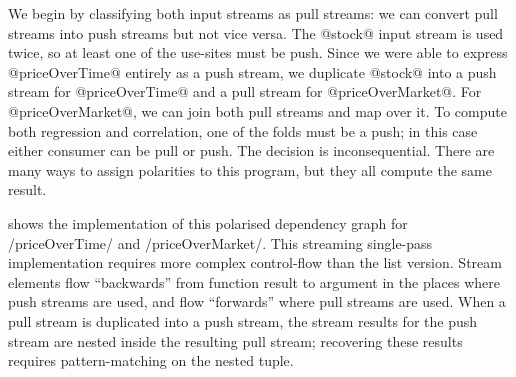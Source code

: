 

We begin by classifying both input streams as pull streams: we can convert pull streams into push streams but not vice versa.
The @stock@ input stream is used twice, so at least one of the use-sites must be push.
Since we were able to express @priceOverTime@ entirely as a push stream, we duplicate @stock@ into a push stream for @priceOverTime@ and a pull stream for @priceOverMarket@.
For @priceOverMarket@, we can join both pull streams and map over it.
To compute both regression and correlation, one of the folds must be a push; in this case either consumer can be pull or push.
The decision is inconsequential.
There are many ways to assign polarities to this program, but they all compute the same result.

 shows the implementation of this polarised dependency graph for \Hs/priceOverTime/ and \Hs/priceOverMarket/.
This streaming single-pass implementation requires more complex control-flow than the list version.
Stream elements flow ``backwards'' from function result to argument in the places where push streams are used, and flow ``forwards'' where pull streams are used.
When a pull stream is duplicated into a push stream, the stream results for the push stream are nested inside the resulting pull stream; recovering these results requires pattern-matching on the nested tuple.


